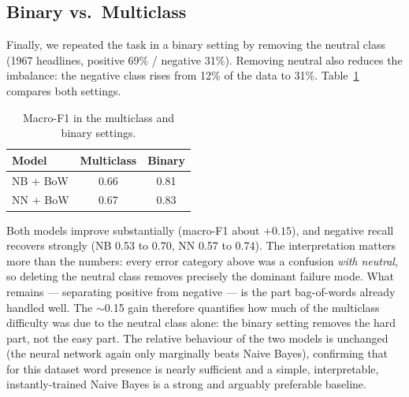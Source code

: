 \subsection{Binary vs.\ Multiclass}

Finally, we repeated the task in a binary setting by removing the neutral
class (1967 headlines, positive 69\% / negative 31\%). Removing neutral
also reduces the imbalance: the negative class rises from 12\% of the
data to 31\%. Table~\ref{tab:binary} compares both settings.

\begin{table}[t]
\centering
\caption{Macro-F1 in the multiclass and binary settings.}
\label{tab:binary}
\begin{tabular}{lcc}
\toprule
Model & Multiclass & Binary \\
\midrule
NB + BoW & 0.66 & 0.81 \\
NN + BoW & 0.67 & 0.83 \\
\bottomrule
\end{tabular}
\end{table}

Both models improve substantially (macro-F1 about $+0.15$), and negative
recall recovers strongly (NB 0.53 to 0.70, NN 0.57 to 0.74). The
interpretation matters more than the numbers: every error category above
was a confusion \emph{with neutral}, so deleting the neutral class
removes precisely the dominant failure mode. What remains --- separating
positive from negative --- is the part bag-of-words already handled well.
The $\sim$0.15 gain therefore quantifies how much of the multiclass
difficulty was due to the neutral class alone: the binary setting removes
the hard part, not the easy part. The relative behaviour of the two
models is unchanged (the neural network again only marginally beats Naive
Bayes), confirming that for this dataset word presence is nearly
sufficient and a simple, interpretable, instantly-trained Naive Bayes is
a strong and arguably preferable baseline.
